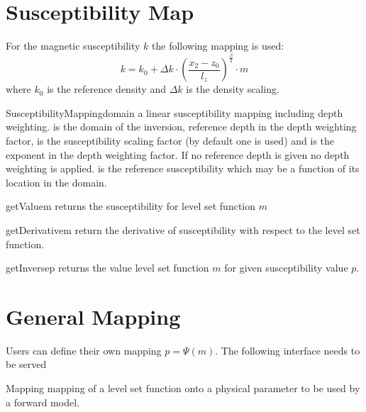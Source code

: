 \section{Susceptibility Map}\label{Chp:ref:mapping susceptibility}
For the magnetic susceptibility $k$ the following mapping is used:
\begin{equation}\label{EQU:MAP:2}
k=  k_{0} + \Delta k \cdot \left( \frac{x_2 - z_0}{l_z} \right)^{\frac{\beta}{2}}  \cdot m 
\end{equation}  
where $k_{0}$ is the reference density and $\Delta k$ is the density scaling.

\begin{classdesc}{SusceptibilityMapping}{domain
        }
a linear susceptibility mapping including depth weighting.
 is the domain of the inversion,  reference depth in
the depth weighting factor,  is the susceptibility scaling factor
(by default one is used) and  is the exponent in the depth
weighting factor. If no reference depth  is given no depth
weighting is applied.
 is the reference susceptibility which may be a function of its
location in the domain. 
\end{classdesc}

\begin{methoddesc}[SusceptibilityMapping]{getValue}{m}
returns the susceptibility for level set function $m$
\end{methoddesc}

\begin{methoddesc}[SusceptibilityMapping]{getDerivative}{m}
return the derivative of susceptibility  with respect to the level set function.
\end{methoddesc}  

\begin{methoddesc}[SusceptibilityMapping]{getInverse}{p}
returns the value level set function $m$ for given susceptibility value $p$.
\end{methoddesc}


\section{General Mapping}
Users can define their own mapping $p=\Psi(m)$.
The following interface needs to be served

\begin{classdesc}{Mapping}{}
mapping of a level set function onto a physical parameter to be used by a
forward model.
\end{classdesc} 

